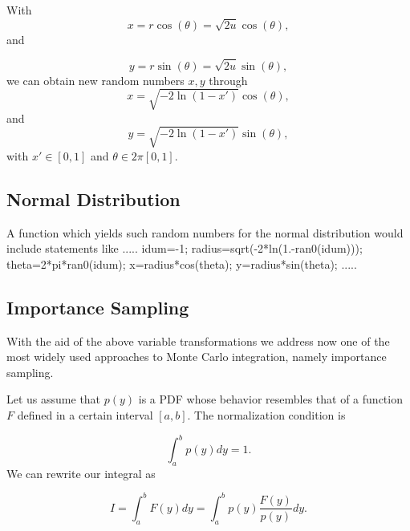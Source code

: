 \documentclass[%
oneside,                 %
final,                   %
10pt]{article}
\newenvironment{block_mdfboxadmon}[1][]{
\begin{block_mdfboxmdframed}[frametitle=#1]
}
{
\end{block_mdfboxmdframed}
}
\begin{document}
\begin{block_mdfboxadmon}[]
With
\begin{equation*}
  x=r\cos{(\theta)}=\sqrt{2u}\cos{(\theta)},
\end{equation*}
and

\begin{equation*}
  y=r\sin{(\theta)}=\sqrt{2u}\sin{(\theta)},
\end{equation*}
we can obtain new random numbers $x,y$ through
\begin{equation*}
  x=\sqrt{-2\ln{(1-x')}}\cos{(\theta)},
\end{equation*}
and
\begin{equation*}
  y=\sqrt{-2\ln{(1-x')}}\sin{(\theta)},
\end{equation*}
with $x'\in [0,1]$ and $\theta \in 2\pi [0,1]$.
\end{block_mdfboxadmon} %



\subsection{Normal Distribution}

\begin{block_mdfboxadmon}[]
A function which yields such random numbers for the normal
distribution would include statements like 
\bcppcod
.....
idum=-1;
radius=sqrt(-2*ln(1.-ran0(idum)));
theta=2*pi*ran0(idum);
x=radius*cos(theta);
y=radius*sin(theta);
.....
\ecppcod
\end{block_mdfboxadmon} %




\subsection{Importance Sampling}

\begin{block_mdfboxadmon}[]
With the aid of the above variable transformations we address now
one of the most widely used approaches to Monte Carlo integration,
namely importance sampling. 

Let us assume that  $p(y)$ is a PDF whose behavior resembles that of a function
$F$ defined in a certain interval $[a,b]$. The normalization condition is

\begin{equation*}
   \int_a^bp(y)dy=1.
\end{equation*}
We can rewrite our integral as

\begin{equation*}
   I=\int_a^b F(y) dy =\int_a^b p(y)\frac{F(y)}{p(y)} dy.
   \label{eq:impsampl1}
\end{equation*}
\end{block_mdfboxadmon} %
\end{document}
